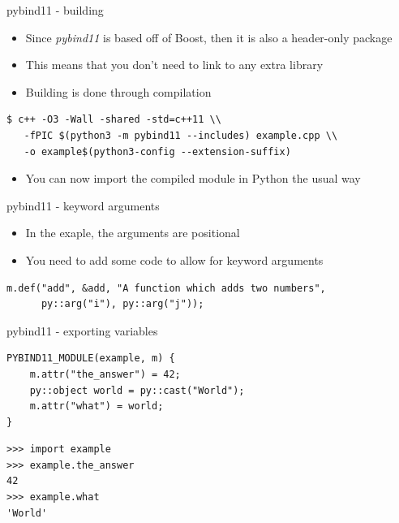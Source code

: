 \documentclass[presentation]{beamer}
\begin{document}
\begin{frame}[label=pybind11---building,fragile]{pybind11 - building}
 \begin{itemize}
\item Since \alert{\emph{pybind11}} is based off of Boost, then it is also a
header-only package
\item This means that you don't need to link to any extra library
\item Building is done through compilation
\end{itemize}

\begin{verbatim}
$ c++ -O3 -Wall -shared -std=c++11 \\
   -fPIC $(python3 -m pybind11 --includes) example.cpp \\
   -o example$(python3-config --extension-suffix)
\end{verbatim}

\begin{itemize}
\item You can now import the compiled module in Python the usual way
\end{itemize}
\end{frame}
\begin{frame}[label=pybind11---keyword-arguments,fragile]{pybind11 - keyword arguments}
 \begin{itemize}
\item In the exaple, the arguments are positional
\item You need to add some code to allow for keyword arguments
\end{itemize}

\begin{verbatim}
m.def("add", &add, "A function which adds two numbers",
      py::arg("i"), py::arg("j"));
\end{verbatim}
\end{frame}
\begin{frame}[label=pybind11---exporting-variables,fragile]{pybind11 - exporting variables}
 \begin{verbatim}
PYBIND11_MODULE(example, m) {
    m.attr("the_answer") = 42;
    py::object world = py::cast("World");
    m.attr("what") = world;
}
\end{verbatim}

\begin{verbatim}
>>> import example
>>> example.the_answer
42
>>> example.what
'World'
\end{verbatim}
\end{frame}
\end{document}
